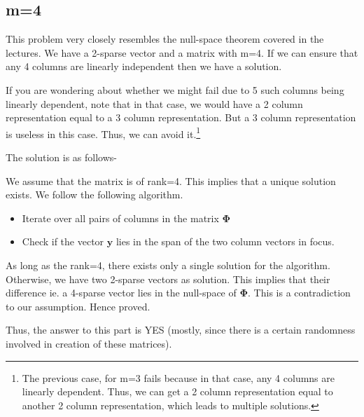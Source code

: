 \documentclass[a4paper,11pt]{article}
\numberwithin{definition}{section}
\numberwithin{mytheorem}{subsection}
\begin{document}
\subsection{m=4}

This problem very closely resembles the null-space theorem covered in the lectures. We have a 2-sparse vector and a matrix with m=4. If we can ensure that any 4 columns are linearly independent then we have a solution. 

If you are wondering about whether we might fail due to 5 such columns being linearly dependent, note that in that case, we would have a 2 column representation equal to a 3 column representation. But a 3 column representation is useless in this case. Thus, we can avoid it.\footnote{The previous case, for m=3 fails because in that case, any 4 columns are linearly dependent. Thus, we can get a 2 column representation equal to another 2 column representation, which leads to multiple solutions.}

The solution is as follows-

We assume that the matrix is of rank=4. This implies that a unique solution exists. We follow the following algorithm.

\begin{itemize}
    \item Iterate over all pairs of columns in the matrix $\mathbf{\Phi}$
    \item Check if the vector $\mathbf{y}$ lies in the span of the two column vectors in focus.
\end{itemize}

As long as the rank=4, there exists only a single solution for the algorithm.
Otherwise, we have two 2-sparse vectors as solution. This implies that their difference ie. a 4-sparse vector lies in the null-space of $\mathbf{\Phi}$. This is a contradiction to our assumption. Hence proved.

Thus, the answer to this part is YES (mostly, since there is a certain randomness involved in creation of these matrices).


\newpage
\end{document}
